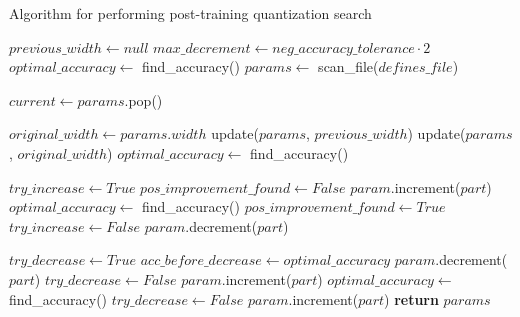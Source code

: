 \begin{algorithm}
  \caption{Algorithm for performing post-training quantization search}\label{alg:post-training-quant}
  \begin{algorithmic}

  \State $previous\_width \gets null$
  \State $max\_decrement \gets neg\_accuracy\_tolerance \cdot 2$ 
  \State $optimal\_accuracy \gets$ find\_accuracy()
  \State $params \gets$ scan\_file($defines\_file$) 

    \State $current \gets params$.pop()

     
      \State $original\_width \gets params.width$
      \State update($params$, $previous\_width$)
        \State update($params$, $original\_width$)
      \Else
        \State $optimal\_accuracy \gets$ find\_accuracy()
      \EndIf
    \EndIf


      \State $try\_increase \gets True$
      \State $pos\_improvement\_found \gets False$
       
        \State $param$.increment($part$)
          \State $optimal\_accuracy \gets$ find\_accuracy()
          \State $pos\_improvement\_found \gets True$
        \Else
          \State $try\_increase \gets False$
          \State $param$.decrement($part$)
        \EndIf
      \EndWhile

       
        \State $try\_decrease \gets True$
        \State $acc\_before\_decrease \gets optimal\_accuracy$
          \State $param$.decrement($part$)
            \State $try\_decrease \gets False$
            \State $param$.increment($part$)
            \State $optimal\_accuracy \gets$ find\_accuracy()
          \Else
            \State $try\_decrease \gets False$
            \State $param$.increment($part$)
        \EndIf
        \EndWhile
      \EndIf
    \EndFor
  \EndWhile
  \State \textbf{return} $params$
  \EndFunction
  \end{algorithmic}
\end{algorithm}


